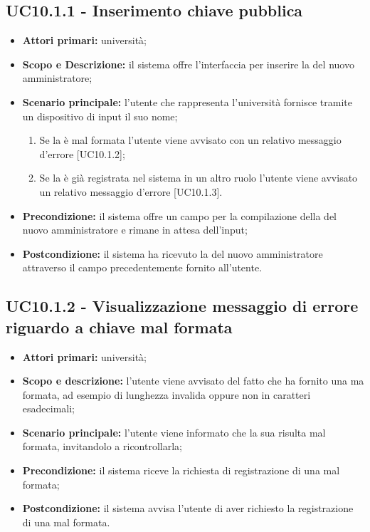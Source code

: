 \documentclass[AnalisiDeiRequisiti.tex]{subfiles}
\begin{document}
\subsection{UC10.1.1 - Inserimento chiave pubblica}
\begin{itemize}
	\item \textbf{Attori primari:} università;
	\item \textbf{Scopo e Descrizione:} il sistema offre l'interfaccia per inserire la  del nuovo amministratore;
	\item \textbf{Scenario principale:} l'utente che rappresenta l'università fornisce tramite un dispositivo di input il suo nome;	\begin{enumerate}
		\item Se la  è mal formata l'utente viene avvisato con un relativo messaggio d'errore [UC10.1.2];
		\item Se la  è già registrata nel sistema in un altro ruolo l'utente viene avvisato un relativo messaggio d'errore [UC10.1.3].
	\end{enumerate}
	\item \textbf{Precondizione:} il sistema offre un campo per la compilazione della  del nuovo amministratore e rimane in attesa dell'input;
	\item \textbf{Postcondizione:} il sistema ha ricevuto la  del nuovo amministratore attraverso il campo precedentemente fornito all'utente.
\end{itemize}
\subsection{UC10.1.2 - Visualizzazione messaggio di errore riguardo a chiave mal formata}
\begin{itemize}
	\item \textbf{Attori primari:} università;
	\item \textbf{Scopo e descrizione:} l'utente viene avvisato del fatto che ha fornito una  ma formata, ad esempio di lunghezza invalida oppure non in caratteri esadecimali;
	\item \textbf{Scenario principale:} l'utente viene informato che la sua  risulta mal formata, invitandolo a ricontrollarla;
	\item \textbf{Precondizione:} il sistema riceve la richiesta di registrazione di una  mal formata;
	\item \textbf{Postcondizione:} il sistema avvisa l'utente di aver richiesto la registrazione di una  mal formata.
\end{itemize}
\end{document}
